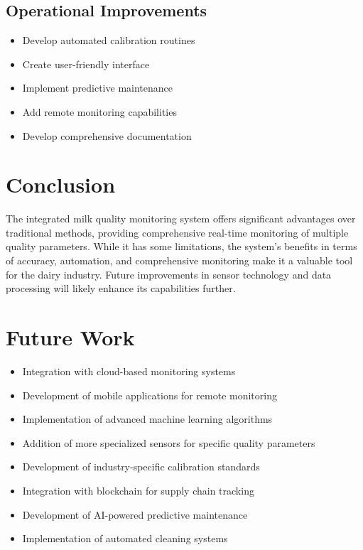 \documentclass[12pt,a4paper]{article}
\begin{document}
\subsection{Operational Improvements}
\begin{itemize}
    \item Develop automated calibration routines
    \item Create user-friendly interface
    \item Implement predictive maintenance
    \item Add remote monitoring capabilities
    \item Develop comprehensive documentation
\end{itemize}

\section{Conclusion}
The integrated milk quality monitoring system offers significant advantages over traditional methods, providing comprehensive real-time monitoring of multiple quality parameters. While it has some limitations, the system's benefits in terms of accuracy, automation, and comprehensive monitoring make it a valuable tool for the dairy industry. Future improvements in sensor technology and data processing will likely enhance its capabilities further.

\section{Future Work}
\begin{itemize}
    \item Integration with cloud-based monitoring systems
    \item Development of mobile applications for remote monitoring
    \item Implementation of advanced machine learning algorithms
    \item Addition of more specialized sensors for specific quality parameters
    \item Development of industry-specific calibration standards
    \item Integration with blockchain for supply chain tracking
    \item Development of AI-powered predictive maintenance
    \item Implementation of automated cleaning systems
\end{itemize}
\end{document}
